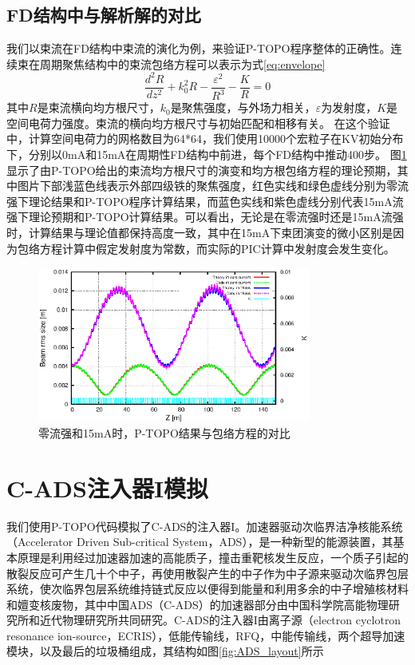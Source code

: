 \subsection{FD结构中与解析解的对比}
我们以束流在FD结构中束流的演化为例，来验证P-TOPO程序整体的正确性。连续束在周期聚焦结构中的束流包络方程可以表示为式\ref{eq:envelope}\cite{wangler1998particle,chen1994nonlinear}
\begin{equation}\label{eq:envelope}
  \frac{{{d}^{2}}R}{d{{z}^{2}}}+k_{0}^{2}R-\frac{{{\varepsilon }^{2}}}{{{R}^{3}}}-\frac{K}{R}=0
\end{equation}
其中$R$是束流横向均方根尺寸，$k_0$是聚焦强度，与外场力相关，$\varepsilon$为发射度，$K$是空间电荷力强度。束流的横向均方根尺寸与初始匹配和相移有关。
在这个验证中，计算空间电荷力的网格数目为64*64，我们使用10000个宏粒子在KV初始分布下，分别以0mA和15mA在周期性FD结构中前进，每个FD结构中推动400步。
图\ref{fig:P_TOPO_verification2}显示了由P-TOPO给出的束流均方根尺寸的演变和均方根包络方程的理论预期，其中图片下部浅蓝色线表示外部四级铁的聚焦强度，红色实线和绿色虚线分别为零流强下理论结果和P-TOPO程序计算结果，而蓝色实线和紫色虚线分别代表15mA流强下理论预期和P-TOPO计算结果。可以看出，无论是在零流强时还是15mA流强时，计算结果与理论值都保持高度一致，其中在15mA下束团演变的微小区别是因为包络方程计算中假定发射度为常数，而实际的PIC计算中发射度会发生变化。

\begin{figure}[!htb]
    \centering
    \includegraphics[width=0.8\textwidth]{Img/P_TOPO_verification2.eps}
    \caption{零流强和15mA时，P-TOPO结果与包络方程的对比}
    \label{fig:P_TOPO_verification2}
\end{figure}

\section{C-ADS注入器I模拟}

我们使用P-TOPO代码模拟了C-ADS的注入器I。加速器驱动次临界洁净核能系统（Accelerator Driven Sub-critical System，ADS），是一种新型的能源装置，其基本原理是利用经过加速器加速的高能质子，撞击重靶核发生反应，一个质子引起的散裂反应可产生几十个中子，再使用散裂产生的中子作为中子源来驱动次临界包层系统，使次临界包层系统维持链式反应以便得到能量和利用多余的中子增殖核材料和嬗变核废物，其中中国ADS（C-ADS）的加速器部分由中国科学院高能物理研究所和近代物理研究所共同研究。C-ADS的注入器I由离子源（electron cyclotron resonance ion-source，ECRIS），低能传输线，RFQ，中能传输线，两个超导加速模块，以及最后的垃圾桶组成，其结构如图\ref{fig:ADS_layout}所示

